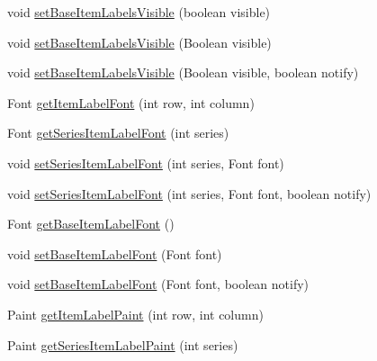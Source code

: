 \begin{DoxyCompactItemize}
void \mbox{\hyperlink{classorg_1_1jfree_1_1chart_1_1renderer_1_1_abstract_renderer_aef1e2688293f0bdb55b4c4cdaf0fde9c}{set\+Base\+Item\+Labels\+Visible}} (boolean visible)
\item 
void \mbox{\hyperlink{classorg_1_1jfree_1_1chart_1_1renderer_1_1_abstract_renderer_ab9850c8c551535e4f5557853d505ac15}{set\+Base\+Item\+Labels\+Visible}} (Boolean visible)
\item 
void \mbox{\hyperlink{classorg_1_1jfree_1_1chart_1_1renderer_1_1_abstract_renderer_aacaab05820eb971e6b960878f4beab5e}{set\+Base\+Item\+Labels\+Visible}} (Boolean visible, boolean notify)
\item 
Font \mbox{\hyperlink{classorg_1_1jfree_1_1chart_1_1renderer_1_1_abstract_renderer_a583573b48578bd0f76f98eafaf6e7988}{get\+Item\+Label\+Font}} (int row, int column)
\item 
Font \mbox{\hyperlink{classorg_1_1jfree_1_1chart_1_1renderer_1_1_abstract_renderer_a541c5cf27a5e10f32716f802b7e6a392}{get\+Series\+Item\+Label\+Font}} (int series)
\item 
void \mbox{\hyperlink{classorg_1_1jfree_1_1chart_1_1renderer_1_1_abstract_renderer_a1da57ed2b155402a119f2c727c07cefe}{set\+Series\+Item\+Label\+Font}} (int series, Font font)
\item 
void \mbox{\hyperlink{classorg_1_1jfree_1_1chart_1_1renderer_1_1_abstract_renderer_a32e7efcb198d49d38e05e8b2823dca04}{set\+Series\+Item\+Label\+Font}} (int series, Font font, boolean notify)
\item 
Font \mbox{\hyperlink{classorg_1_1jfree_1_1chart_1_1renderer_1_1_abstract_renderer_aa6277326bc1ddd480515de060803b682}{get\+Base\+Item\+Label\+Font}} ()
\item 
void \mbox{\hyperlink{classorg_1_1jfree_1_1chart_1_1renderer_1_1_abstract_renderer_aced8e1ceab30b0c47a3397fc92a513e5}{set\+Base\+Item\+Label\+Font}} (Font font)
\item 
void \mbox{\hyperlink{classorg_1_1jfree_1_1chart_1_1renderer_1_1_abstract_renderer_a4d629460f56707639561cf4296721553}{set\+Base\+Item\+Label\+Font}} (Font font, boolean notify)
\item 
Paint \mbox{\hyperlink{classorg_1_1jfree_1_1chart_1_1renderer_1_1_abstract_renderer_a93763c8ae33a08723fbe454d93cf1b5c}{get\+Item\+Label\+Paint}} (int row, int column)
\item 
Paint \mbox{\hyperlink{classorg_1_1jfree_1_1chart_1_1renderer_1_1_abstract_renderer_a529914230c394fd2600e3aa35d529b63}{get\+Series\+Item\+Label\+Paint}} (int series)
\item 

\end{DoxyCompactItemize}
